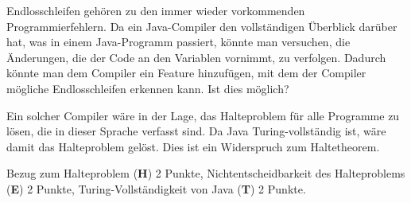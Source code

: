 Endlosschleifen gehören zu den immer wieder vorkommenden Programmierfehlern.
Da ein Java-Compiler den vollständigen Überblick darüber hat, was in einem
Java-Programm passiert, könnte man versuchen, die Änderungen, die der Code
an den Variablen vornimmt, zu verfolgen.
Dadurch könnte man dem Compiler ein Feature hinzufügen, mit dem der
Compiler mögliche Endlosschleifen erkennen kann.
Ist dies möglich?


\begin{loesung}
Ein solcher Compiler wäre in der Lage, das Halteproblem für alle
Programme zu lösen, die in dieser Sprache verfasst sind.
Da Java Turing-vollständig ist, wäre damit das Halteproblem gelöst.
Dies ist ein Widerspruch zum Haltetheorem.
\end{loesung}

\begin{bewertung}
Bezug zum Halteproblem ({\bf H}) 2 Punkte,
Nichtentscheidbarkeit des Halteproblems ({\bf E}) 2 Punkte,
Turing-Vollständigkeit von Java ({\bf T}) 2 Punkte.
\end{bewertung}

